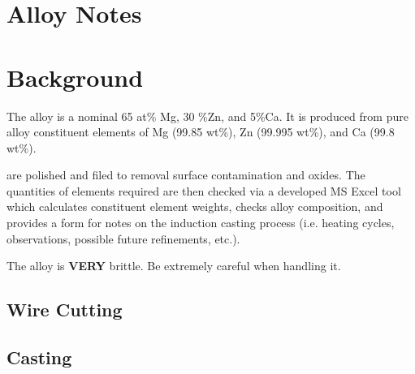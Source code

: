 \section{\MgZnCa Alloy Notes}

\section{Background}
The \MgZnCa alloy is a nominal 65 at\% Mg, 30 \%Zn, and 5\%Ca. It is produced from pure alloy constituent elements of Mg (99.85 wt\%), Zn (99.995 wt\%), and Ca (99.8 wt\%). 

are polished and filed to removal surface contamination and oxides. The quantities of elements required are then checked via a developed MS Excel tool which calculates constituent element weights, checks alloy composition, and provides a form for notes on the induction casting process (i.e. heating cycles, observations, possible future refinements, etc.).

The \MgZnCa alloy is \textbf{VERY} brittle. Be extremely careful when handling it. 

\subsection{Wire Cutting}


\subsection{Casting}

